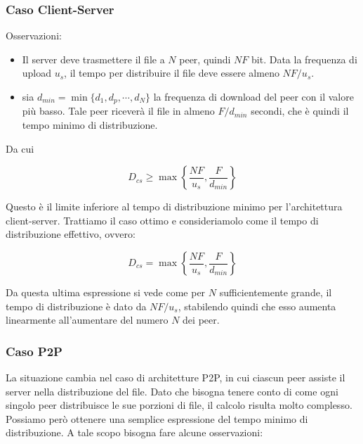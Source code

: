 \subsubsection{Caso Client-Server}\label{caso-client-server}

Osservazioni:

\begin{itemize}
\item
  Il server deve trasmettere il file a $N$ peer, quindi $NF$ bit. Data
  la frequenza di upload $u_s$, il tempo per distribuire il file deve
  essere almeno $NF/u_s$.
\item
  sia $d_{min} = \min\{d_1,d_p,\cdots,d_N \}$ la frequenza di download
  del peer con il valore più basso. Tale peer riceverà il file in almeno
  $F/d_{min}$ secondi, che è quindi il tempo minimo di distribuzione.
\end{itemize}

Da cui

\[D_{cs} \geq \max \left\lbrace \frac{NF}{u_s}, \frac{F}{d_{min}} \right\rbrace\]

Questo è il limite inferiore al tempo di distribuzione minimo per
l'architettura client-server. Trattiamo il caso ottimo e consideriamolo
come il tempo di distribuzione effettivo, ovvero:

\[D_{cs} = \max \left\lbrace \frac{NF}{u_s}, \frac{F}{d_{min}} \right\rbrace\]

Da questa ultima espressione si vede come per $N$ sufficientemente
grande, il tempo di distribuzione è dato da $NF/u_s$, stabilendo quindi
che esso aumenta linearmente all'aumentare del numero $N$ dei peer.

\subsubsection{Caso P2P}\label{caso-p2p}

La situazione cambia nel caso di architetture P2P, in cui ciascun peer
assiste il server nella distribuzione del file. Dato che bisogna tenere
conto di come ogni singolo peer distribuisce le sue porzioni di file, il
calcolo risulta molto complesso. Possiamo però ottenere una semplice
espressione del tempo minimo di distribuzione. A tale scopo bisogna fare
alcune osservazioni:

